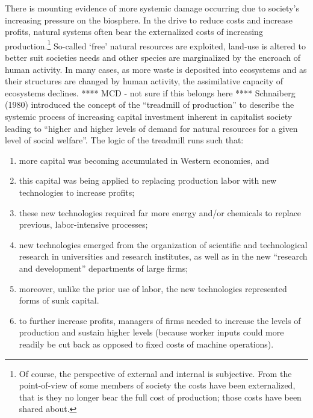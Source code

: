 There is mounting evidence of more systemic
damage occurring due to society's increasing pressure on
the biosphere.\cite{MEA2005,Ewing2008}
In the drive to reduce costs and increase profits,
natural systems often bear the externalized costs
of increasing production.\footnote{Of course,
	the perspective of external and internal is subjective.
	From the point-of-view of some members of society
	the costs have been externalized, 
	that is they no longer bear the full cost of production;
	those costs have been shared about.}
So-called `free' natural resources are exploited,
land-use is altered to better suit societies needs
and other species are marginalized by the encroach of human activity.\cite{Schnaiberg1980}
In many cases, as more waste is deposited into ecosystems
and as their structures are changed by human activity,
the assimilative capacity of ecosystems declines.\cite{UNMEA2005}
**** MCD - not sure if this belongs here ****
Schnaiberg (1980) introduced the concept of 
the ``treadmill of production'' to describe the systemic process of
increasing capital investment inherent in capitalist society
leading to ``higher and higher levels of demand for natural resources 
for a given level of social welfare''.\cite[p.297]{Gould2004}
The logic of the treadmill runs such that:
\begin{enumerate}
	\item more capital was becoming accumulated in Western economies, and 
	\item this capital was being applied to replacing production labor 
				with new technologies to increase profits; 
	\item these new technologies required far more energy and/or chemicals 
				to replace previous, labor-intensive processes;
	\item new technologies emerged from the organization of scientific and 
				technological research in universities and research institutes, 
				as well as in the new ``research and development'' departments of large firms;
	\item moreover, unlike the prior use of labor, the new technologies represented forms of sunk capital. 
	\item to further increase profits, managers of firms needed to increase the levels of production 
				and sustain higher levels (because worker inputs could more readily be cut back 
				as opposed to fixed costs of machine operations).\cite[p.296]{Gould2004}
\end{enumerate}


